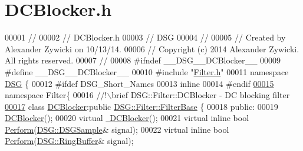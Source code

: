 \hypertarget{_d_c_blocker_8h_source}{\section{D\+C\+Blocker.\+h}
\label{_d_c_blocker_8h_source}
}

\begin{DoxyCode}
00001 \textcolor{comment}{//}
00002 \textcolor{comment}{//  DCBlocker.h}
00003 \textcolor{comment}{//  DSG}
00004 \textcolor{comment}{//}
00005 \textcolor{comment}{//  Created by Alexander Zywicki on 10/13/14.}
00006 \textcolor{comment}{//  Copyright (c) 2014 Alexander Zywicki. All rights reserved.}
00007 \textcolor{comment}{//}
00008 \textcolor{preprocessor}{#ifndef \_\_DSG\_\_DCBlocker\_\_}
00009 \textcolor{preprocessor}{#define \_\_DSG\_\_DCBlocker\_\_}
00010 \textcolor{preprocessor}{#include "\hyperlink{_filter_8h}{Filter.h}"}
00011 \textcolor{keyword}{namespace }\hyperlink{namespace_d_s_g}{DSG} \{
00012 \textcolor{preprocessor}{#ifdef DSG\_Short\_Names}
00013     \textcolor{keyword}{inline}
00014 \textcolor{preprocessor}{#endif}
\hypertarget{_d_c_blocker_8h_source_l00015}{}\hyperlink{namespace_d_s_g_1_1_filter}{00015}     \textcolor{keyword}{namespace }Filter\{\textcolor{comment}{}
00016 \textcolor{comment}{        //!\(\backslash\)brief DSG::Filter::DCBlocker - DC blocking filter}
\hypertarget{_d_c_blocker_8h_source_l00017}{}\hyperlink{class_d_s_g_1_1_filter_1_1_d_c_blocker}{00017} \textcolor{comment}{}        \textcolor{keyword}{class }\hyperlink{class_d_s_g_1_1_filter_1_1_d_c_blocker}{DCBlocker}:\textcolor{keyword}{public} \hyperlink{class_d_s_g_1_1_filter_1_1_filter_base}{DSG::Filter::FilterBase} \{
00018         \textcolor{keyword}{public}:
00019             \hyperlink{class_d_s_g_1_1_filter_1_1_d_c_blocker_a71cb7abe6fca10f64402971d8b4a6eb3}{DCBlocker}();
00020             \textcolor{keyword}{virtual} \hyperlink{class_d_s_g_1_1_filter_1_1_d_c_blocker_a5393dac29a226f5912f6d1705b69eecf}{~DCBlocker}();
00021             \textcolor{keyword}{virtual} \textcolor{keyword}{inline} \textcolor{keywordtype}{bool} \hyperlink{class_d_s_g_1_1_filter_1_1_d_c_blocker_a9757794b5f9b7789132e5eaa44e07cef}{Perform}(\hyperlink{namespace_d_s_g_ac39a94cd27ebcd9c1e7502d0c624894a}{DSG::DSGSample}& signal);
00022             \textcolor{keyword}{virtual} \textcolor{keyword}{inline} \textcolor{keywordtype}{bool} \hyperlink{class_d_s_g_1_1_filter_1_1_d_c_blocker_a9757794b5f9b7789132e5eaa44e07cef}{Perform}(\hyperlink{class_d_s_g_1_1_ring_buffer}{DSG::RingBuffer}& signal);

\end{DoxyCode}
